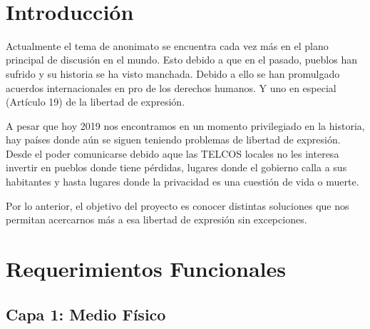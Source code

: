\documentclass{article}
\begin{document}
\begin{adjustwidth}{8.8cm}{}
~\vfill

\section{Introducción}\label{introducciuxf3n}
\large
\begin{sloppypar}
Actualmente el tema de anonimato se encuentra cada vez más en el plano
principal de discusión en el mundo. Esto debido a que en el pasado,
pueblos han sufrido y su historia se ha visto manchada. Debido a ello se
han promulgado acuerdos internacionales en pro de los derechos humanos.
Y uno en especial (Artículo 19) de la libertad de expresión.

A pesar que hoy 2019 nos encontramos en un momento privilegiado en la
historia, hay países donde aún se siguen teniendo problemas de libertad
de expresión. Desde el poder comunicarse debido aque las TELCOS locales
no les interesa invertir en pueblos donde tiene pérdidas, lugares donde
el gobierno calla a sus habitantes y hasta lugares donde la privacidad
es una cuestión de vida o muerte.

Por lo anterior, el objetivo del proyecto es conocer distintas
soluciones que nos permitan acercarnos más a esa libertad de expresión
sin excepciones.
\end{sloppypar}

\vspace{1.5cm}

\end{adjustwidth}


\newcommand{\sectionbreak}{\clearpage}

\section{Requerimientos Funcionales}\label{requerimientos-funcionales}

\subsection{Capa 1: Medio Físico}\label{capa-1-medio-fuxedsico}
\end{document}
